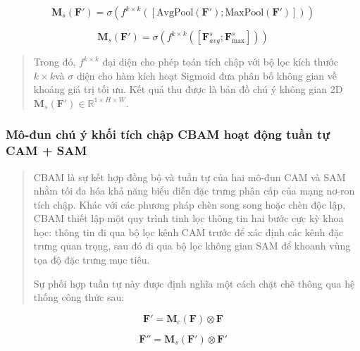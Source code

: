 \documentclass[
]{article}
\begin{document}
\[\mathbf{M}_{s}\left( \mathbf{F}' \right) = \sigma\left( f^{k \times k}\left( \left\lbrack \text{AvgPool}\left( \mathbf{F}' \right);\text{MaxPool}\left( \mathbf{F}' \right) \right\rbrack \right) \right)\]

\[\mathbf{M}_{s}\left( \mathbf{F}' \right) = \sigma\left( f^{k \times k}\left( \left\lbrack \mathbf{F}_{avg}^{s};\mathbf{F}_{\max}^{s} \right\rbrack \right) \right)\]

\begin{quote}
Trong đó, \(f^{k \times k}\) đại diện cho phép toán tích chập với bộ lọc
kích thước \(k \times k\)và \(\sigma\) diện cho hàm kích hoạt Sigmoid
đưa phân bố không gian về khoảng giá trị tối ưu. Kết quả thu được là bản
đồ chú ý không gian 2D
\(\mathbf{M}_{s}\left( \mathbf{F}' \right) \in \mathbb{R}^{1 \times H \times W}\).
\end{quote}

\hypertarget{muxf4-ux111un-chuxfa-uxfd-khux1ed1i-tuxedch-chux1eadp-cbam-houx1ea1t-ux111ux1ed9ng-tuux1ea7n-tux1ef1-cam-sam}{%
\subsubsection{Mô-đun chú ý khối tích chập CBAM hoạt động tuần tự CAM +
SAM}\label{muxf4-ux111un-chuxfa-uxfd-khux1ed1i-tuxedch-chux1eadp-cbam-houx1ea1t-ux111ux1ed9ng-tuux1ea7n-tux1ef1-cam-sam}}

\begin{quote}
CBAM là sự kết hợp đồng bộ và tuần tự của hai mô-đun CAM và SAM nhằm tối
đa hóa khả năng biểu diễn đặc trưng phân cấp của mạng nơ-ron tích chập.
Khác với các phương pháp chèn song song hoặc chèn độc lập, CBAM thiết
lập một quy trình tinh lọc thông tin hai bước cực kỳ khoa học: thông tin
đi qua bộ lọc kênh CAM trước để xác định các kênh đặc trưng quan trọng,
sau đó đi qua bộ lọc không gian SAM để khoanh vùng tọa độ đặc trưng mục
tiêu.

Sự phối hợp tuần tự này được định nghĩa một cách chặt chẽ thông qua hệ
thống công thức sau:
\end{quote}

\[\mathbf{F}' = \mathbf{M}_{c}\left( \mathbf{F} \right) \otimes \mathbf{F}\]

\[\mathbf{F}'' = \mathbf{M}_{s}\left( \mathbf{F}' \right) \otimes \mathbf{F}'\]
\end{document}
